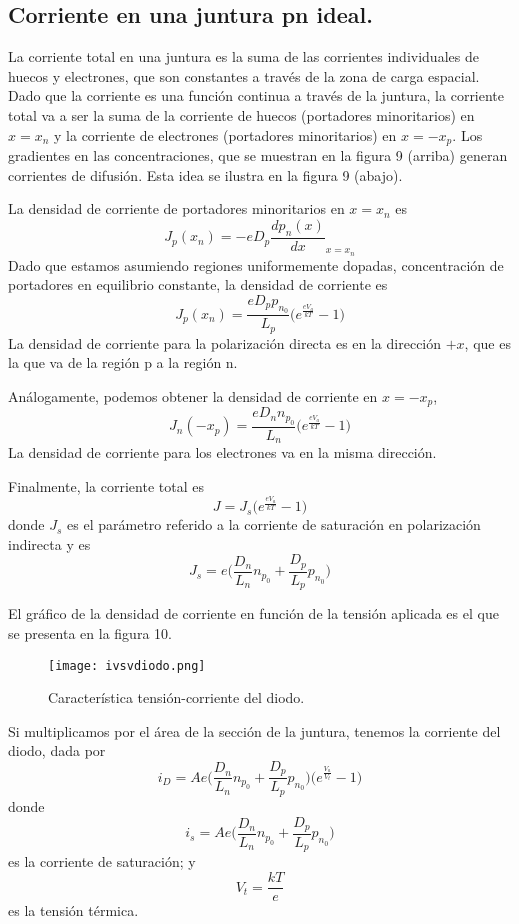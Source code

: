 \documentclass[12pt,a4paper]{article}
\begin{document}
\subsection{Corriente en una juntura pn ideal.}

La corriente total en una juntura es la suma de las corrientes individuales de huecos y electrones, que son constantes a través de la zona de carga espacial. Dado que la corriente es una función continua a través de la juntura, la corriente total va a ser la suma de la corriente de huecos (portadores minoritarios) en $x=x_{n}$ y la corriente de electrones (portadores minoritarios) en $x=-x_{p}$. Los gradientes en las concentraciones, que se muestran en la figura 9 (arriba) generan corrientes de difusión. Esta idea se ilustra en la figura 9 (abajo).

La densidad de corriente de portadores minoritarios en $x=x_{n}$ es
\[ J_{p}(x_{n})=-eD_{p} \frac{dp_{n}(x)}{dx}_{x=x_{n}} \]
Dado que estamos asumiendo regiones uniformemente dopadas, concentración de portadores en equilibrio constante, la densidad de corriente es
\[ J_{p}(x_{n})=\frac{eD_{p}p_{n_{0}}}{L_{p}} \big( e^{\frac{eV_{a}}{kT}} - 1 \big) \]
La densidad de corriente para la polarización directa es en la dirección $+x$, que es la que va de la región p a la región n.

Análogamente, podemos obtener la densidad de corriente en $x=-x_{p}$,
\[ J_{n}(-x_{p})=\frac{eD_{n}n_{p_{0}}}{L_{n}} \big( e^{\frac{eV_{a}}{kT}} - 1 \big) \]
La densidad de corriente para los electrones va en la misma dirección.

Finalmente, la corriente total es
\[ J=J_{s} \big( e^{\frac{eV_{a}}{kT}} - 1 \big) \]
donde $J_{s}$ es el parámetro referido a la corriente de saturación en polarización indirecta y es
\[ J_{s}= e \bigg( \frac{D_{n}}{L_{n}} n_{p_{0}}+\frac{D_{p}}{L_{p}} p_{n_{0}} \bigg) \]

El gráfico de la densidad de corriente en función de la tensión aplicada es el que se presenta en la figura 10.

\begin{figure}[ht!]
\begin{center}
\texttt{[image: ivsvdiodo.png]}
\caption{Característica tensión-corriente del diodo.}
\end{center}
\end{figure}

Si multiplicamos por el área de la sección de la juntura, tenemos la corriente del diodo, dada por
\[ i_{D}= A e \bigg( \frac{D_{n}}{L_{n}} n_{p_{0}}+\frac{D_{p}}{L_{p}} p_{n_{0}} \bigg) \big( e^{\frac{V_{a}}{V_{t}}} - 1 \big) \]
donde
\[ i_{s} = A e \bigg( \frac{D_{n}}{L_{n}} n_{p_{0}}+\frac{D_{p}}{L_{p}} p_{n_{0}} \bigg) \]
es la corriente de saturación; y
\[ V_{t} = \frac{kT}{e} \]
es la tensión térmica.
\end{document}
